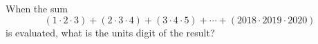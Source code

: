 When the sum
\[
(1\cdot2\cdot3)+(2\cdot3\cdot4)+(3\cdot4\cdot5)+\cdots+(2018\cdot2019\cdot2020)
\]
is evaluated, what is the units digit of the result?
